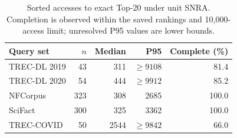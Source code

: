 \begin{table}[t]
\centering
\caption{Sorted accesses to exact Top-20 under unit SNRA. Completion is observed within the saved rankings and 10,000-access limit; unresolved P95 values are lower bounds.}
\label{tab:cost}
\small
\setlength{\tabcolsep}{3pt}
\begin{tabular}{lrrrr}
\toprule
Query set & $n$ & Median & P95 & Complete (\%) \\
\midrule
TREC-DL 2019 & 43 & 311 & $\geq 9108$ & 81.4 \\
TREC-DL 2020 & 54 & 444 & $\geq 9912$ & 85.2 \\
NFCorpus & 323 & 308 & 2685 & 100.0 \\
SciFact & 300 & 325 & 3362 & 100.0 \\
TREC-COVID & 50 & 2544 & $\geq 9842$ & 66.0 \\
\bottomrule
\end{tabular}
\end{table}
